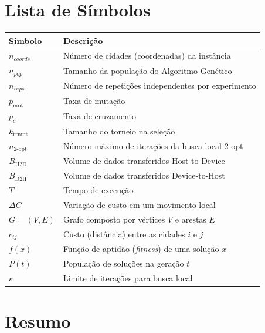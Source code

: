 \section*{Lista de Símbolos}\label{lista-de-simbolos}

\begin{longtable}[]{@{}ll@{}}
\toprule\noalign{}
Símbolo & Descrição \\
\midrule\noalign{}
\endhead
\bottomrule\noalign{}
\endlastfoot
\(n_{coords}\) & Número de cidades (coordenadas) da instância \\
\(n_{pop}\) & Tamanho da população do Algoritmo Genético \\
\(n_{reps}\) & Número de repetições independentes por experimento \\
\(p_{\text{mut}}\) & Taxa de mutação \\
\(p_c\) & Taxa de cruzamento \\
\(k_{\text{trnmt}}\) & Tamanho do torneio na seleção \\
\(n_{2\text{-opt}}\) & Número máximo de iterações da busca local
2-opt \\
\(B_{\mathrm{H2D}}\) & Volume de dados transferidos Host-to-Device \\
\(B_{\mathrm{D2H}}\) & Volume de dados transferidos Device-to-Host \\
\(T\) & Tempo de execução \\
\(\Delta C\) & Variação de custo em um movimento local \\
\(G = (V, E)\) & Grafo composto por vértices \(V\) e arestas \(E\) \\
\(c_{ij}\) & Custo (distância) entre as cidades \(i\) e \(j\) \\
\(f(x)\) & Função de aptidão (\emph{fitness}) de uma solução \(x\) \\
\(P(t)\) & População de soluções na geração \(t\) \\
\(\kappa\) & Limite de iterações para busca local \\
\end{longtable}

\listoffigures

\listoftables

\section*{Resumo}\label{resumo}

